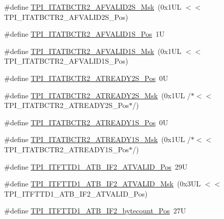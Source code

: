 \begin{DoxyCompactItemize}
\item 
\#define \hyperlink{group___c_m_s_i_s___t_p_i_ga840a62dd0a903c7c0d90214e57f89f6f}{T\+P\+I\+\_\+\+I\+T\+A\+T\+B\+C\+T\+R2\+\_\+\+A\+F\+V\+A\+L\+I\+D2\+S\+\_\+\+Msk}~(0x1\+U\+L $<$$<$ T\+P\+I\+\_\+\+I\+T\+A\+T\+B\+C\+T\+R2\+\_\+\+A\+F\+V\+A\+L\+I\+D2\+S\+\_\+\+Pos)
\item 
\#define \hyperlink{group___c_m_s_i_s___t_p_i_ga15b83625dedbaa8acaab637185cf4fab}{T\+P\+I\+\_\+\+I\+T\+A\+T\+B\+C\+T\+R2\+\_\+\+A\+F\+V\+A\+L\+I\+D1\+S\+\_\+\+Pos}~1U
\item 
\#define \hyperlink{group___c_m_s_i_s___t_p_i_gaf25272d068154278decc987e101bfac7}{T\+P\+I\+\_\+\+I\+T\+A\+T\+B\+C\+T\+R2\+\_\+\+A\+F\+V\+A\+L\+I\+D1\+S\+\_\+\+Msk}~(0x1\+U\+L $<$$<$ T\+P\+I\+\_\+\+I\+T\+A\+T\+B\+C\+T\+R2\+\_\+\+A\+F\+V\+A\+L\+I\+D1\+S\+\_\+\+Pos)
\item 
\#define \hyperlink{group___c_m_s_i_s___t_p_i_gaa94a190da6db605987bb65d4bd76415a}{T\+P\+I\+\_\+\+I\+T\+A\+T\+B\+C\+T\+R2\+\_\+\+A\+T\+R\+E\+A\+D\+Y2\+S\+\_\+\+Pos}~0U
\item 
\#define \hyperlink{group___c_m_s_i_s___t_p_i_ga7530ebf5f4ae263bf9621d901f9840ee}{T\+P\+I\+\_\+\+I\+T\+A\+T\+B\+C\+T\+R2\+\_\+\+A\+T\+R\+E\+A\+D\+Y2\+S\+\_\+\+Msk}~(0x1\+U\+L /$\ast$$<$$<$ T\+P\+I\+\_\+\+I\+T\+A\+T\+B\+C\+T\+R2\+\_\+\+A\+T\+R\+E\+A\+D\+Y2\+S\+\_\+\+Pos$\ast$/)
\item 
\#define \hyperlink{group___c_m_s_i_s___t_p_i_ga52812ab751c370d2d34e55275d896128}{T\+P\+I\+\_\+\+I\+T\+A\+T\+B\+C\+T\+R2\+\_\+\+A\+T\+R\+E\+A\+D\+Y1\+S\+\_\+\+Pos}~0U
\item 
\#define \hyperlink{group___c_m_s_i_s___t_p_i_gabcc13f970f966e62158aea015b910f6b}{T\+P\+I\+\_\+\+I\+T\+A\+T\+B\+C\+T\+R2\+\_\+\+A\+T\+R\+E\+A\+D\+Y1\+S\+\_\+\+Msk}~(0x1\+U\+L /$\ast$$<$$<$ T\+P\+I\+\_\+\+I\+T\+A\+T\+B\+C\+T\+R2\+\_\+\+A\+T\+R\+E\+A\+D\+Y1\+S\+\_\+\+Pos$\ast$/)
\item 
\#define \hyperlink{group___c_m_s_i_s___t_p_i_gae08894135bf256813f4298ba0ea3964c}{T\+P\+I\+\_\+\+I\+T\+F\+T\+T\+D1\+\_\+\+A\+T\+B\+\_\+\+I\+F2\+\_\+\+A\+T\+V\+A\+L\+I\+D\+\_\+\+Pos}~29U
\item 
\#define \hyperlink{group___c_m_s_i_s___t_p_i_gab90afcecec23b0a84f60858a4becf101}{T\+P\+I\+\_\+\+I\+T\+F\+T\+T\+D1\+\_\+\+A\+T\+B\+\_\+\+I\+F2\+\_\+\+A\+T\+V\+A\+L\+I\+D\+\_\+\+Msk}~(0x3\+U\+L $<$$<$ T\+P\+I\+\_\+\+I\+T\+F\+T\+T\+D1\+\_\+\+A\+T\+B\+\_\+\+I\+F2\+\_\+\+A\+T\+V\+A\+L\+I\+D\+\_\+\+Pos)
\item 
\#define \hyperlink{group___c_m_s_i_s___t_p_i_ga1faf942e53403e99b720cd9bd337834b}{T\+P\+I\+\_\+\+I\+T\+F\+T\+T\+D1\+\_\+\+A\+T\+B\+\_\+\+I\+F2\+\_\+bytecount\+\_\+\+Pos}~27U
$$
\end{DoxyCompactItemize}
